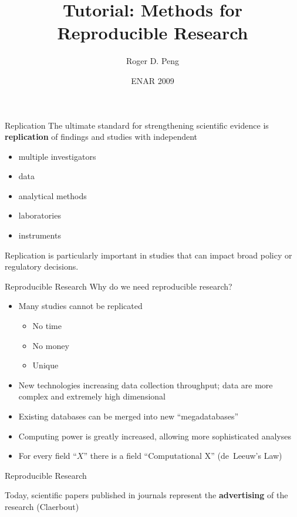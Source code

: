 \documentclass{beamer}
\title[Methods for Reproducible Research]{Tutorial: Methods for
  Reproducible Research}
\author{Roger D. Peng\inst{}}
\institute{
  Department Biostatistics\\
  Johns Hopkins Bloomberg School of Public Health
}
\date[ENAR 2009]{ENAR 2009}
\begin{document}
\begin{frame}
\maketitle
\end{frame}


\begin{frame}{Replication}
  The ultimate standard for strengthening scientific evidence is
  \textbf{replication} of findings and studies with independent
\begin{itemize}
\item multiple investigators
\item data
\item analytical methods
\item laboratories
\item instruments
\end{itemize}
Replication is particularly important in studies that can impact broad
policy or regulatory decisions.
\end{frame}

\begin{frame}{Reproducible Research}
  Why do we need reproducible research?
  \begin{itemize}
    \item Many studies cannot be replicated
      \begin{itemize}
      \item No time
      \item No money
      \item Unique
      \end{itemize}
    \item New technologies increasing data collection throughput; data
      are more complex and extremely high dimensional
    \item Existing databases can be merged into new ``megadatabases''
    \item Computing power is greatly increased, allowing more
      sophisticated analyses
    \item For every field ``$X$'' there is a field ``Computational X''
      (de~Leeuw's Law)
  \end{itemize}  
\end{frame}

\begin{frame}{Reproducible Research}
  
  Today, scientific papers published in journals represent the
  \textbf{advertising} of the research (Claerbout)

\end{frame}  
\end{document}
